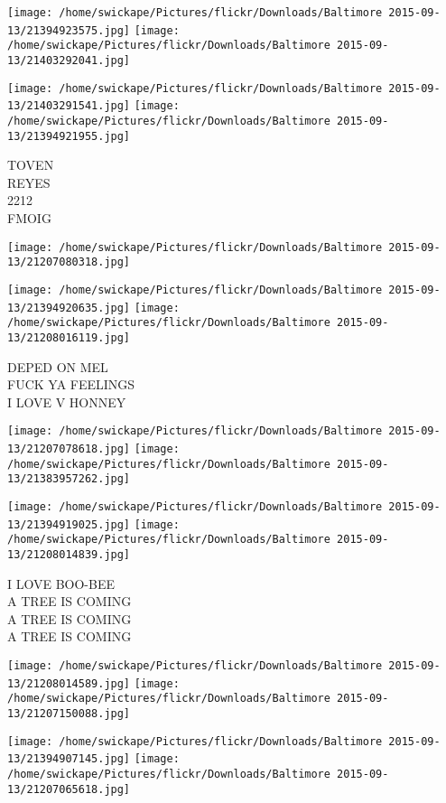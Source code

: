 \documentclass[10pt,letterpaper]{article}
\begin{document}
\texttt{[image: /home/swickape/Pictures/flickr/Downloads/Baltimore 2015-09-13/21394923575.jpg]}
\texttt{[image: /home/swickape/Pictures/flickr/Downloads/Baltimore 2015-09-13/21403292041.jpg]}

\texttt{[image: /home/swickape/Pictures/flickr/Downloads/Baltimore 2015-09-13/21403291541.jpg]}
\texttt{[image: /home/swickape/Pictures/flickr/Downloads/Baltimore 2015-09-13/21394921955.jpg]}

TOVEN\\
REYES\\
2212\\
FMOIG
\pagebreak

\texttt{[image: /home/swickape/Pictures/flickr/Downloads/Baltimore 2015-09-13/21207080318.jpg]}

\vspace{0.25in}
\texttt{[image: /home/swickape/Pictures/flickr/Downloads/Baltimore 2015-09-13/21394920635.jpg]}
\texttt{[image: /home/swickape/Pictures/flickr/Downloads/Baltimore 2015-09-13/21208016119.jpg]}

DEPED ON MEL\\
FUCK YA FEELINGS\\
I LOVE V HONNEY
\pagebreak

\texttt{[image: /home/swickape/Pictures/flickr/Downloads/Baltimore 2015-09-13/21207078618.jpg]}
\texttt{[image: /home/swickape/Pictures/flickr/Downloads/Baltimore 2015-09-13/21383957262.jpg]}

\texttt{[image: /home/swickape/Pictures/flickr/Downloads/Baltimore 2015-09-13/21394919025.jpg]}
\texttt{[image: /home/swickape/Pictures/flickr/Downloads/Baltimore 2015-09-13/21208014839.jpg]}

I LOVE BOO{-}BEE\\
A TREE IS COMING\\
A TREE IS COMING\\
A TREE IS COMING
\pagebreak

\texttt{[image: /home/swickape/Pictures/flickr/Downloads/Baltimore 2015-09-13/21208014589.jpg]}
\texttt{[image: /home/swickape/Pictures/flickr/Downloads/Baltimore 2015-09-13/21207150088.jpg]}

\texttt{[image: /home/swickape/Pictures/flickr/Downloads/Baltimore 2015-09-13/21394907145.jpg]}
\texttt{[image: /home/swickape/Pictures/flickr/Downloads/Baltimore 2015-09-13/21207065618.jpg]}
\end{document}
